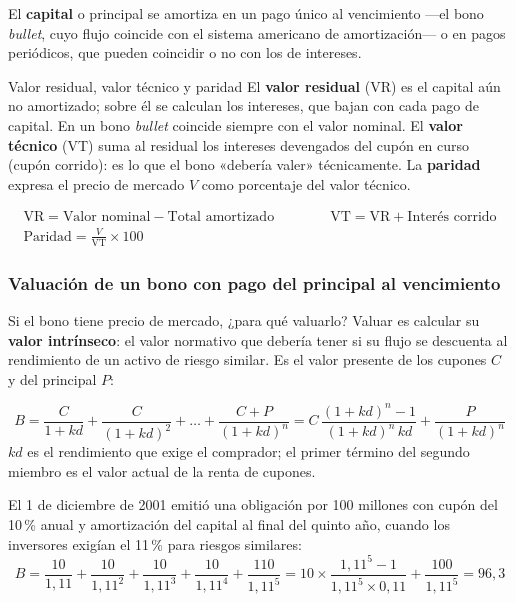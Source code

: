 El \textbf{capital} o principal se amortiza en un pago único al vencimiento —el bono \emph{bullet}, cuyo flujo coincide con el sistema americano de amortización— o en pagos periódicos, que pueden coincidir o no con los de intereses.

\begin{definicion}{Valor residual, valor técnico y paridad}
El \textbf{valor residual} (VR) es el capital aún no amortizado; sobre él se calculan los intereses, que bajan con cada pago de capital. En un bono \emph{bullet} coincide siempre con el valor nominal. El \textbf{valor técnico} (VT) suma al residual los intereses devengados del cupón en curso (cupón corrido): es lo que el bono «debería valer» técnicamente. La \textbf{paridad} expresa el precio de mercado $V$ como porcentaje del valor técnico.
\end{definicion}

\begin{formulaBox}
\[
\begin{gathered}
\text{VR} = \text{Valor nominal} - \text{Total amortizado}
\qquad\qquad
\text{VT} = \text{VR} + \text{Interés corrido}
\\[4pt]
\text{Paridad} = \frac{V}{\text{VT}}\times 100
\end{gathered}
\]
\end{formulaBox}

\subsubsection{Valuación de un bono con pago del principal al vencimiento}

Si el bono tiene precio de mercado, ¿para qué valuarlo? Valuar es calcular su \textbf{valor intrínseco}: el valor normativo que debería tener si su flujo se descuenta al rendimiento de un activo de riesgo similar. Es el valor presente de los cupones $C$ y del principal $P$:

\begin{formulaBox}
\[
B = \frac{C}{1+kd} + \frac{C}{(1+kd)^{2}} + \dots + \frac{C+P}{(1+kd)^{n}}
  = C\,\frac{(1+kd)^{n}-1}{(1+kd)^{n}\,kd} + \frac{P}{(1+kd)^{n}}
\]
$kd$ es el rendimiento que exige el comprador; el primer término del segundo miembro es el valor actual de la renta de cupones.
\end{formulaBox}

\begin{ejemplo}
El 1 de diciembre de 2001 emitió una obligación por 100 millones con cupón del 10\,\% anual y amortización del capital al final del quinto año, cuando los inversores exigían el 11\,\% para riesgos similares:
\[
B = \frac{10}{1{,}11} + \frac{10}{1{,}11^{2}} + \frac{10}{1{,}11^{3}} + \frac{10}{1{,}11^{4}} + \frac{110}{1{,}11^{5}}
  = 10\times\frac{1{,}11^{5}-1}{1{,}11^{5}\times 0{,}11} + \frac{100}{1{,}11^{5}} = 96{,}3
\]
\end{ejemplo}

